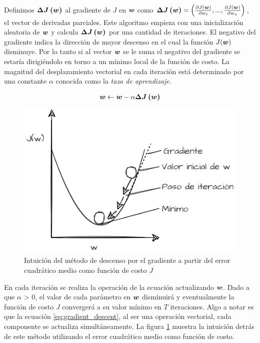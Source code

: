 Definimos $\boldsymbol{\Delta J\left( w \right)}$ al gradiente de $J$ en $\boldsymbol{w}$
como $\boldsymbol{\Delta J\left( \boldsymbol{w} \right)} = \left(\frac{\partial
J(\boldsymbol{w})}{\partial w_1}, ..., \frac{\partial J(\boldsymbol{w})}{\partial w_n}
\right)$, el vector de derivadas parciales. Este algoritmo empieza con una
inicialización aleatoria de $\boldsymbol{w}$ y calcula
$\boldsymbol{\Delta J\left( w \right)}$ por una cantidad de iteraciones. El negativo del gradiente indica la dirección de mayor descenso en el cual la función $J(\boldsymbol{w})$ disminuye. Por lo tanto si
al vector $\boldsymbol{w}$ se le suma el negativo del gradiente se estaría
dirigiéndolo en torno a un mínimo local de la función de costo. La magnitud del
desplazamiento vectorial en cada iteración está determinado por una constante
$\alpha$ conocida como la \emph{taza de aprendizaje}.

\begin{align} \label{eq:gradient_descent}
    \boldsymbol{w} \leftarrow \boldsymbol{w} - \alpha \boldsymbol{\Delta J\left( w \right)}
\end{align}

\begin{figure}
    \centering
    \includegraphics[scale=0.5]{figures/gradient_descent_plot.png}
    \caption{Intuición del método de descenso por el gradiente a partir del error cuadrático medio como función de costo $J$}
    \label{fig:gradient_descent}
\end{figure}

En cada iteración se realiza la operación de la ecuación actualizando
$\boldsymbol{w}$. Dado a que $\alpha$ > 0, el valor de cada parámetro en $\boldsymbol{w}$ disminuirá
y eventualmente la función de costo $J$ convergerá a su valor mínimo en $T$
iteraciones. Algo a notar es que la ecuación \ref{eq:gradient_descent}, al ser una operación vectorial, cada componente se actualiza simultáneamente. La figura \ref{fig:gradient_descent} muestra la intuición detrás de este método utilizando el error cuadrático medio como función de costo.

